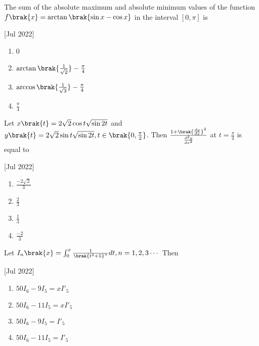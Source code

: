     \item The sum of the absolute maximum and absolute minimum values of the function $f\brak{x}=\arctan\brak{\sin x-\cos x}$ in the interval $\left[0,\pi\right]$ is
    
    \hfill[Jul 2022]

        \begin{multicols}{4}
            \begin{enumerate}
                \item 0
                \item $\arctan\brak{\frac{1}{\sqrt{2}}}-\frac{\pi}{4}$
                \item $\arccos\brak{\frac{1}{\sqrt{3}}}-\frac{\pi}{4}$
                \item $\frac{\pi}{4}$
            \end{enumerate}
        \end{multicols}
		
    \item Let $x\brak{t}=2\sqrt{2}\cos{t}\sqrt{\sin{2t}}$ and $y\brak{t}=2\sqrt{2}\sin{t}\sqrt{\sin{2t}},t\in\brak{0,\frac{\pi}{2}}$. Then $\frac{1+\brak{\frac{dy}{dx}}^2}{\frac{d^2y}{dx^2}}$ at $t=\frac{\pi}{4}$ is equal to
    
    \hfill[Jul 2022]

        \begin{multicols}{4}
            \begin{enumerate}
                \item $\frac{-2\sqrt{2}}{3}$
                \item $\frac{2}{3}$
                \item $\frac{1}{3}$
                \item $\frac{-2}{3}$
            \end{enumerate}
        \end{multicols}

    \item Let $I_n\brak{x}=\int_0^x\frac{1}{\brak{t^2+5}^n}dt,n=1,2,3\cdots$ Then 
    
    \hfill[Jul 2022]

        \begin{multicols}{4}
            \begin{enumerate}
                \item $50I_6-9I_5=xI'_5$
                \item $50I_6-11I_5=xI'_5$
                \item $50I_6-9I_5=I'_5$
                \item $50I_6-11I_5=I'_5$
            \end{enumerate}
        \end{multicols}

